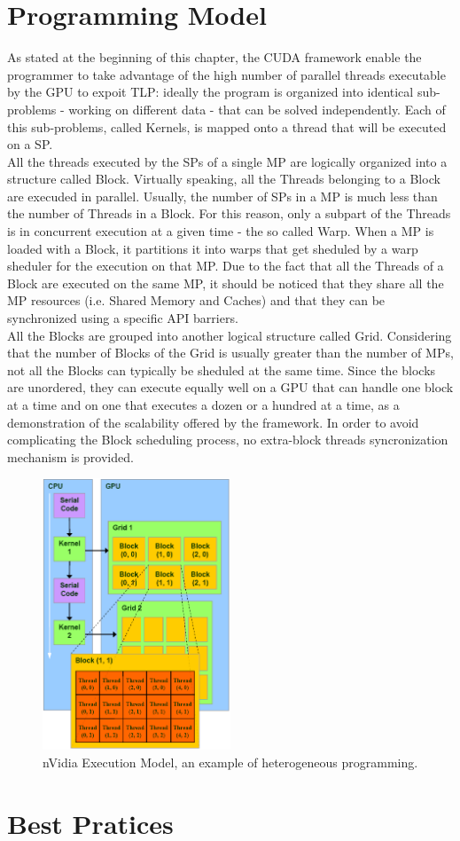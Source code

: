 \section{Programming Model}
As stated at the beginning of this chapter, the CUDA framework enable the programmer to take advantage of the high number of parallel threads executable by the GPU to expoit TLP: ideally the program is organized into identical sub-problems - working on different data - that can be solved independently. Each of this sub-problems, called Kernels, is mapped onto a thread that will be executed on a SP.\\
All the threads executed by the SPs of a single MP are logically organized into a structure called Block. Virtually speaking, all the Threads belonging to a Block are execuded in parallel. Usually, the number of SPs in a MP is much less than the number of Threads in a Block. For this reason, only a subpart of the Threads is in concurrent execution at a given time - the so called Warp. When a MP is loaded with a Block, it partitions it into warps that get sheduled by a warp sheduler for the execution on that MP. Due to the fact that all the Threads of a Block are executed on the same MP, it should be noticed that they share all the MP resources (i.e. Shared Memory and Caches) and that they can be synchronized using a specific API barriers.\\
All the Blocks are grouped into another logical structure called Grid. Considering that the number of Blocks of the Grid is usually greater than the number of MPs, not all the Blocks can typically be sheduled at the same time. Since the blocks are unordered, they can execute equally well on a GPU that can handle one block at a time and on one that executes a dozen or a hundred at a time, as a demonstration of the scalability offered by the framework. In order to avoid complicating the Block scheduling process, no extra-block threads syncronization mechanism is provided.\\ 

\begin{figure}[h!bt]
	\centerline{\includegraphics[width=0.5\textwidth]{img/nVidiaExecutionModel.png}}
	\caption{nVidia Execution Model, an example of heterogeneous programming.}
	\label{fig:nVidiaGPUsLogicalOrg}
\end{figure}

\section{Best Pratices}

